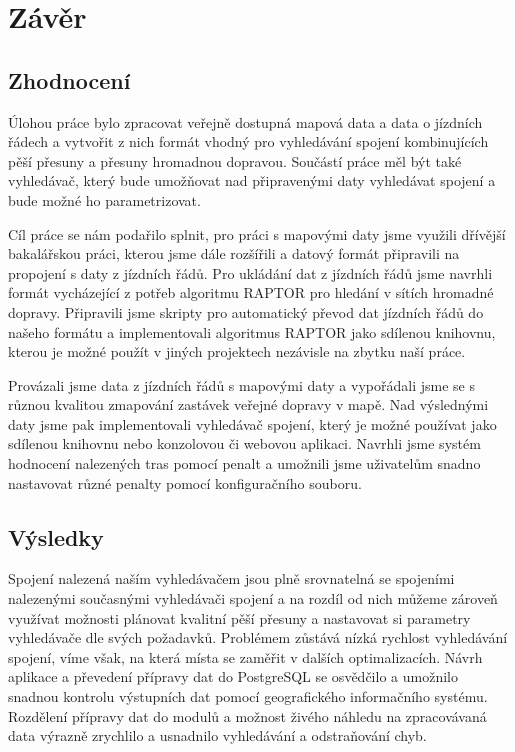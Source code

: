 \chapter*{Závěr}

\section{Zhodnocení}
Úlohou práce bylo zpracovat veřejně dostupná mapová data a data o jízdních
řádech a vytvořit z nich formát vhodný pro vyhledávání spojení kombinujících
pěší přesuny a přesuny hromadnou dopravou. Součástí práce měl být také
vyhledávač, který bude umožňovat nad připravenými daty vyhledávat spojení a bude
možné ho parametrizovat.

Cíl práce se nám podařilo splnit, pro práci s mapovými daty jsme využili
dřívější bakalářskou práci, kterou jsme dále rozšířili a datový formát
připravili na propojení s daty z jízdních řádů. Pro ukládání dat z jízdních
řádů jsme navrhli formát vycházející z potřeb algoritmu RAPTOR pro hledání v
sítích hromadné dopravy. Připravili jsme skripty pro automatický převod dat
jízdních řádů do našeho formátu a implementovali algoritmus RAPTOR jako sdílenou
knihovnu, kterou je možné použít v jiných projektech nezávisle na zbytku naší
práce. 

Provázali jsme data z jízdních řádů s mapovými daty a vypořádali jsme se s
různou kvalitou zmapování zastávek veřejné dopravy v mapě. Nad výslednými daty
jsme pak implementovali vyhledávač spojení, který je možné používat jako
sdílenou knihovnu nebo konzolovou či webovou aplikaci. Navrhli jsme systém
hodnocení nalezených tras pomocí penalt a umožnili jsme uživatelům snadno
nastavovat různé penalty pomocí konfiguračního souboru. 

\section{Výsledky}
Spojení nalezená naším vyhledávačem jsou plně srovnatelná se spojeními
nalezenými současnými vyhledávači spojení a na rozdíl od nich můžeme zároveň
využívat možnosti plánovat kvalitní pěší přesuny a nastavovat si parametry
vyhledávače dle svých požadavků. Problémem zůstává nízká rychlost vyhledávání
spojení, víme však, na která místa se zaměřit v dalších optimalizacích. Návrh
aplikace a převedení přípravy dat do PostgreSQL se osvědčilo a umožnilo snadnou
kontrolu výstupních dat pomocí geografického informačního systému. Rozdělení
přípravy dat do modulů a možnost živého náhledu na zpracovávaná data výrazně
zrychlilo a usnadnilo vyhledávání a odstraňování chyb.

